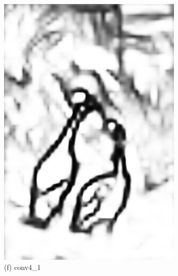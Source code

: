 \documentclass[CJK,aspectratio=169]{beamer}  %
\begin{document}
\begin{frame}
\begin{figure}
\begin{minipage}{0.11\columnwidth}
				\includegraphics[width=\linewidth]{picture/LLIE/RCF/conv4_1}
				\caption*{\tiny (f) conv4\_1}
				\label{fig: conv4_1}
			\end{minipage}
			\begin{minipage}{0.11\columnwidth}

\end{minipage}
\end{figure}
\end{frame}
\end{document}
